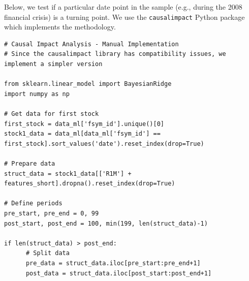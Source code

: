 Below, we test if a particular date point in the sample (e.g., during the 2008 financial crisis) is a turning point. We use the \texttt{causalimpact} Python package which implements the methodology.

\begin{verbatim}
# Causal Impact Analysis - Manual Implementation                                                  
# Since the causalimpact library has compatibility issues, we implement a simpler version         
                                                                                                    
from sklearn.linear_model import BayesianRidge                                                    
import numpy as np                                                                                
                                                                                                    
# Get data for first stock                                                                        
first_stock = data_ml['fsym_id'].unique()[0]                                                      
stock1_data = data_ml[data_ml['fsym_id'] ==                                                       
first_stock].sort_values('date').reset_index(drop=True)                                           
                                                                                                    
# Prepare data                                                                                    
struct_data = stock1_data[['R1M'] + features_short].dropna().reset_index(drop=True)               
                                                                                                    
# Define periods                                                                                  
pre_start, pre_end = 0, 99                                                                        
post_start, post_end = 100, min(199, len(struct_data)-1)                                          
                                                                                                    
if len(struct_data) > post_end:                                                                   
      # Split data                                                                                  
      pre_data = struct_data.iloc[pre_start:pre_end+1]                                              
      post_data = struct_data.iloc[post_start:post_end+1]                                           
                                                                                                    

\end{verbatim}
